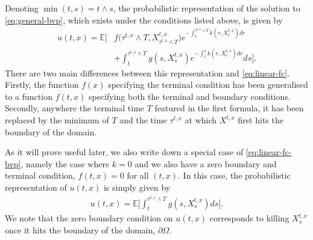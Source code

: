 Denoting $\min{(t,s)} = t \wedge s$, the probabilistic representation of the solution to \autoref{eq:general-bvp}, which exists under the conditions listed above, is given by
%
\begin{align} 
    \label{eq:linear-fc-bvp}
    u(t,x) = \mathbb{E} \bigg[ &f\big(\tau^{t,x} \wedge T , X^{t,x}_{\tau^{t,x}\wedge T}\big) e^{-\int_t^{\tau^{t,x}\wedge T} k(r,X^{t,x}_r) dr}\\
    & + \int_t^{\tau^{t,x}\wedge T} g(s,X^{t,x}_s) e^{-\int_t^s k(r,X^{t,x}_r) dr} ds \bigg].
\end{align}
%
There are two main differences between this representation and \autoref{eq:linear-fc}. Firstly, the function $f(x)$ specifying the terminal condition has been generalised to a function $f(t,x)$ specifying both the terminal and boundary conditions. Secondly, anywhere the terminal time $T$ featured in the first formula, it has been replaced by the minimum of $T$ and the time $\tau^{t,x}$ at which $X^{t,x}$ first hits the boundary of the domain.

As it will prove useful later, we also write down a special case of \autoref{eq:linear-fc-bvp}, namely the case where $k=0$ and we also have a zero boundary and terminal condition, $f(t,x)=0$ for all $(t,x)$. In this case, the probabilistic representation of $u(t,x)$ is simply given by
%
\begin{align} 
    u(t,x) = \mathbb{E} \bigg[ \int_t^{\tau^{t,x}\wedge T} g(s,X^{t,x}_s) ds \bigg].
\end{align}
%
We note that the zero boundary condition on $u(t,x)$ corresponds to killing $X_s^{t,x}$ once it hits the boundary of the domain, $\partial \Omega$.

